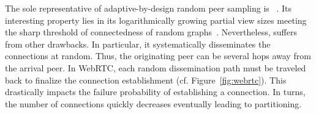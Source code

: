 The sole representative of adaptive-by-design random peer sampling is
\SCAMP~\cite{ganesh2003peer}. Its interesting property lies in
its logarithmically growing partial view sizes meeting the sharp threshold of
connectedness of random graphs~\cite{erdos1959random}. Nevertheless, \SCAMP
suffers from other drawbacks. In particular, it systematically disseminates the
connections at random. Thus, the originating peer can be several hops away from
the arrival peer. In WebRTC, each random dissemination path must be traveled
back to finalize the connection establishment
(cf. Figure~\ref{fig:webrtc}). This drastically impacts the \SCAMP failure
probability of establishing a connection. In turns, the number of connections
quickly decreases eventually leading to partitioning.


